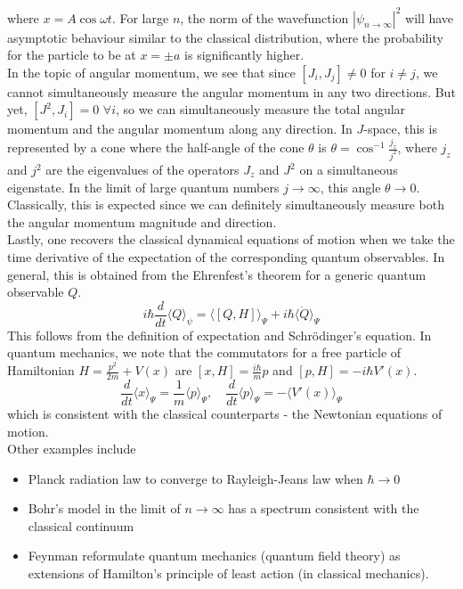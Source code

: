 \documentclass[a4paper]{article}
\begin{document}
where $x=A\cos\omega t$. For large $n$, the norm of the wavefunction $|\psi_{n\rightarrow\infty}|^2$ will have asymptotic behaviour similar to the classical distribution, where the probability for the particle to be at $x=\pm a$ is significantly higher.\\[5pt]
In the topic of angular momentum, we see that since $[J_i,J_j]\neq 0$ for $i\neq j$, we cannot simultaneously measure the angular momentum in any two directions. But yet, $[J^2,J_i]=0$ $\forall i$, so we can simultaneously measure the total angular momentum and the angular momentum along any direction. In $J$-space, this is represented by a cone where the half-angle of the cone $\theta$ is $\theta=\cos^{-1}\frac{j_z}{j^2}$, where $j_z$ and $j^2$ are the eigenvalues of the operators $J_z$ and $J^2$ on a simultaneous eigenstate. In the limit of large quantum numbers $j\rightarrow\infty$, this angle $\theta\rightarrow 0$. Classically, this is expected since we can definitely simultaneously measure both the angular momentum magnitude and direction.\\[5pt]
Lastly, one recovers the classical dynamical equations of motion when we take the time derivative of the expectation of the corresponding quantum observables. In general, this is obtained from the Ehrenfest's theorem for a generic quantum observable $Q$. 
$$i\hbar\frac{d}{dt}\langle Q\rangle_\psi=\langle [Q,H]\rangle_\Psi+i\hbar\langle\dot{Q}\rangle_\Psi$$
This follows from the definition of expectation and Schr\"{o}dinger's equation. In quantum mechanics, we note that the commutators for a free particle of Hamiltonian $H=\frac{p^2}{2m}+V(x)$ are $[x,H]=\frac{i\hbar}{m}p$ and $[p,H]=-i\hbar V'(x)$.
$$\frac{d}{dt}\langle x\rangle_\Psi=\frac{1}{m}\langle p\rangle_\Psi,\quad\frac{d}{dt}\langle p\rangle_\Psi=-\langle V'(x)\rangle_\Psi$$
which is consistent with the classical counterparts - the Newtonian equations of motion. \\[5pt]
Other examples include
\begin{itemize}
    \item Planck radiation law to converge to Rayleigh-Jeans law when $\hbar\rightarrow 0$
    \item Bohr's model in the limit of $n\rightarrow\infty$ has a spectrum consistent with the classical continuum
    \item Feynman reformulate quantum mechanics (quantum field theory) as extensions of Hamilton's principle of least action (in classical mechanics).
\end{itemize}
\end{document}
